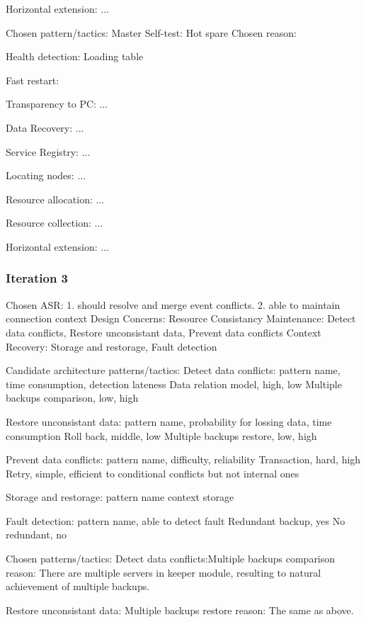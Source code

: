 \documentclass{article}
\begin{document}
		Horizontal extension:
			...

		Chosen pattern/tactics:
			Master Self-test:
				Hot spare
			Chosen reason: 

			Health detection:
				Loading table
			
			Fast restart:
				
			
			Transparency to PC:
				...
			
			Data Recovery:
				...
			
			Service Registry:
				...
			
			Locating nodes:
				... 

			Resource allocation:
				...

			Resource collection:
				... 

			Horizontal extension:
				...
		
		\subsubsection{Iteration 3}
		Chosen ASR: 
		1. should resolve and merge event conflicts.
		2. able to maintain connection context
		Design Concerns: 
		Resource Consistancy Maintenance: Detect data conflicts, Restore unconsistant data, Prevent data conflicts
		Context Recovery: Storage and restorage, Fault detection

		Candidate architecture patterns/tactics:
		Detect data conflicts:
			pattern name, time consumption, detection lateness
			Data relation model, high, low
			Multiple backups comparison, low, high
		
		Restore unconsistant data:
			pattern name, probability for lossing data, time consumption
			Roll back, middle, low
			Multiple backups restore, low, high
		
		Prevent data conflicts:
			pattern name, difficulty, reliability
			Transaction, hard, high
			Retry, simple, efficient to conditional conflicts but not internal ones

		Storage and restorage:
			pattern name
			context storage

		Fault detection:
			pattern name, able to detect fault
			Redundant backup, yes
			No redundant, no
		
		
		Chosen patterns/tactics:
		Detect data conflicts:Multiple backups comparison
		reason: There are multiple servers in keeper module, resulting to natural achievement of multiple backups.   

		Restore unconsistant data: Multiple backups restore
		reason: The same as above.
\end{document}
